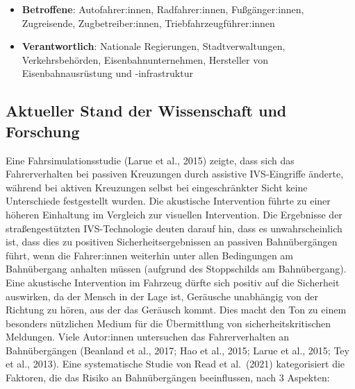 \documentclass[
]{book}
\providecommand{\tightlist}{%
  \setlength{\itemsep}{0pt}\setlength{\parskip}{0pt}}
\begin{document}
\begin{itemize}
\tightlist
\item
  \textbf{Betroffene}: Autofahrer:innen, Radfahrer:innen, Fußgänger:innen, Zugreisende, Zugbetreiber:innen, Triebfahrzeugführer:innen
\item
  \textbf{Verantwortlich}: Nationale Regierungen, Stadtverwaltungen, Verkehrsbehörden, Eisenbahnunternehmen, Hersteller von Eisenbahnausrüstung und -infrastruktur
\end{itemize}

\hypertarget{aktueller-stand-der-wissenschaft-und-forschung-2}{%
\subsection*{Aktueller Stand der Wissenschaft und Forschung}\label{aktueller-stand-der-wissenschaft-und-forschung-2}}

Eine Fahrsimulationsstudie (Larue et al., 2015) zeigte, dass sich das Fahrerverhalten bei passiven Kreuzungen durch assistive IVS-Eingriffe änderte, während bei aktiven Kreuzungen selbst bei eingeschränkter Sicht keine Unterschiede festgestellt wurden. Die akustische Intervention führte zu einer höheren Einhaltung im Vergleich zur visuellen Intervention. Die Ergebnisse der straßengestützten IVS-Technologie deuten darauf hin, dass es unwahrscheinlich ist, dass dies zu positiven Sicherheitsergebnissen an passiven Bahnübergängen führt, wenn die Fahrer:innen weiterhin unter allen Bedingungen am Bahnübergang anhalten müssen (aufgrund des Stoppschilds am Bahnübergang). Eine akustische Intervention im Fahrzeug dürfte sich positiv auf die Sicherheit auswirken, da der Mensch in der Lage ist, Geräusche unabhängig von der Richtung zu hören, aus der das Geräusch kommt. Dies macht den Ton zu einem besonders nützlichen Medium für die Übermittlung von sicherheitskritischen Meldungen.
Viele Autor:innen untersuchen das Fahrerverhalten an Bahnübergängen (Beanland et al., 2017; Hao et al., 2015; Larue et al., 2015; Tey et al., 2013). Eine systematische Studie von Read et al.~(2021) kategorisiert die Faktoren, die das Risiko an Bahnübergängen beeinflussen, nach 3 Aspekten:
\end{document}
